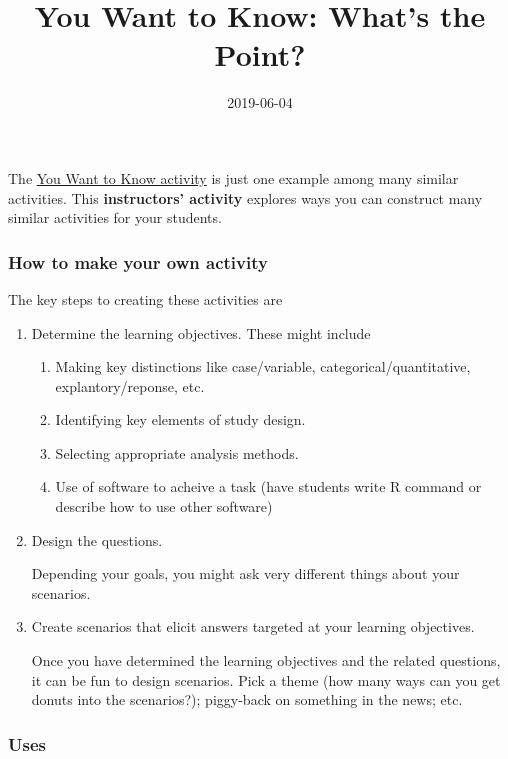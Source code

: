 \documentclass[]{article}
\title{You Want to Know: What's the Point?}
\author{}
\date{2019-06-04}
\providecommand{\tightlist}{%
  \setlength{\itemsep}{0pt}\setlength{\parskip}{0pt}}
\begin{document}
\maketitle

The \href{/blog/activity-you-want-to-know/}{You Want to Know activity}
is just one example among many similar activities. This
\textbf{instructors' activity} explores ways you can construct many
similar activities for your students.

\hypertarget{how-to-make-your-own-activity}{%
\subsubsection{How to make your own
activity}\label{how-to-make-your-own-activity}}

The key steps to creating these activities are

\begin{enumerate}
\def\labelenumi{\arabic{enumi}.}
\item
  Determine the learning objectives. These might include

  \begin{enumerate}
  \def\labelenumii{\alph{enumii}.}
  \tightlist
  \item
    Making key distinctions like case/variable,
    categorical/quantitative, explantory/reponse, etc.
  \item
    Identifying key elements of study design.
  \item
    Selecting appropriate analysis methods.
  \item
    Use of software to acheive a task (have students write R command or
    describe how to use other software)
  \end{enumerate}
\item
  Design the questions.

  Depending your goals, you might ask very different things about your
  scenarios.
\item
  Create scenarios that elicit answers targeted at your learning
  objectives.

  Once you have determined the learning objectives and the related
  questions, it can be fun to design scenarios. Pick a theme (how many
  ways can you get donuts into the scenarios?); piggy-back on something
  in the news; etc.
\end{enumerate}

\hypertarget{uses}{%
\subsubsection{Uses}\label{uses}}
\end{document}
